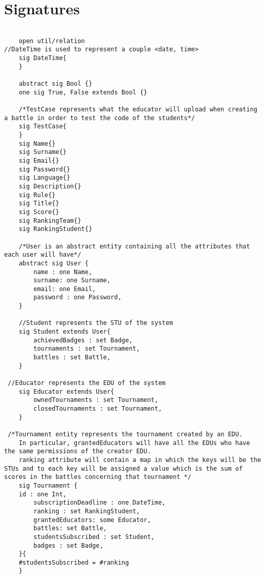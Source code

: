 \section[Signatures]{Signatures}
\begin{lstlisting}[language=Alloy,  label={lst:alloycode}, basicstyle=\fontfamily{Roboto}\selectfont\ttfamily]
        
    open util/relation
//DateTime is used to represent a couple <date, time>
    sig DateTime{
    }

    abstract sig Bool {}
    one sig True, False extends Bool {}

    /*TestCase represents what the educator will upload when creating a battle in order to test the code of the students*/
    sig TestCase{
    }
    sig Name{}
    sig Surname{}
    sig Email{}
    sig Password{}
    sig Language{}
    sig Description{}
    sig Rule{}
    sig Title{}
    sig Score{}
    sig RankingTeam{}
    sig RankingStudent{}

    /*User is an abstract entity containing all the attributes that each user will have*/ 
    abstract sig User {
        name : one Name,
        surname: one Surname,
        email: one Email,
        password : one Password,
    }

    //Student represents the STU of the system
    sig Student extends User{
        achievedBadges : set Badge,
        tournaments : set Tournament,
        battles : set Battle,
    }

 //Educator represents the EDU of the system
    sig Educator extends User{
        ownedTournaments : set Tournament,
        closedTournaments : set Tournament,
    }

 /*Tournament entity represents the tournament created by an EDU. 
    In particular, grantedEducators will have all the EDUs who have the same permissions of the creator EDU.
    ranking attribute will contain a map in which the keys will be the STUs and to each key will be assigned a value which is the sum of scores in the battles concerning that tournament */
    sig Tournament {
	id : one Int,
        subscriptionDeadline : one DateTime,
        ranking : set RankingStudent, 
        grantedEducators: some Educator,
        battles: set Battle,
        studentsSubscribed : set Student,
        badges : set Badge,
    }{
	#studentsSubscribed = #ranking
	}
   

\end{lstlisting}
